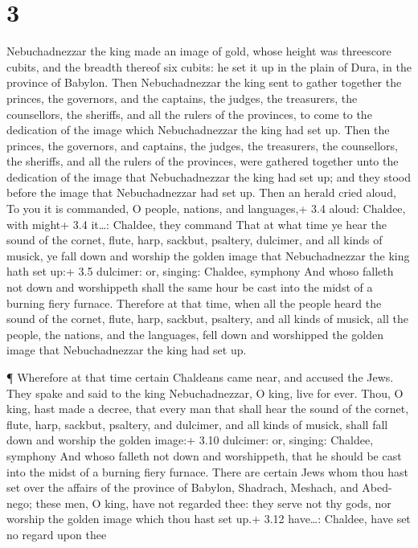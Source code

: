 \hypertarget{section-2}{%
\section{3}\label{section-2}}

 Nebuchadnezzar the king made an image of gold, whose height
was threescore cubits, and the breadth thereof six cubits: he set it up
in the plain of Dura, in the province of Babylon.  Then
Nebuchadnezzar the king sent to gather together the princes, the
governors, and the captains, the judges, the treasurers, the
counsellors, the sheriffs, and all the rulers of the provinces, to come
to the dedication of the image which Nebuchadnezzar the king had set up.
 Then the princes, the governors, and captains, the judges,
the treasurers, the counsellors, the sheriffs, and all the rulers of the
provinces, were gathered together unto the dedication of the image that
Nebuchadnezzar the king had set up; and they stood before the image that
Nebuchadnezzar had set up.  Then an herald cried aloud, To
you it is commanded, O people, nations, and languages,+ 3.4 aloud:
Chaldee, with might+ 3.4 it\ldots: Chaldee, they command 
That at what time ye hear the sound of the cornet, flute, harp, sackbut,
psaltery, dulcimer, and all kinds of musick, ye fall down and worship
the golden image that Nebuchadnezzar the king hath set up:+ 3.5
dulcimer: or, singing: Chaldee, symphony  And whoso falleth
not down and worshippeth shall the same hour be cast into the midst of a
burning fiery furnace.  Therefore at that time, when all the
people heard the sound of the cornet, flute, harp, sackbut, psaltery,
and all kinds of musick, all the people, the nations, and the languages,
fell down and worshipped the golden image that Nebuchadnezzar the king
had set up.

 ¶ Wherefore at that time certain Chaldeans came near, and
accused the Jews.  They spake and said to the king
Nebuchadnezzar, O king, live for ever.  Thou, O king, hast
made a decree, that every man that shall hear the sound of the cornet,
flute, harp, sackbut, psaltery, and dulcimer, and all kinds of musick,
shall fall down and worship the golden image:+ 3.10 dulcimer: or,
singing: Chaldee, symphony  And whoso falleth not down and
worshippeth, that he should be cast into the midst of a burning fiery
furnace.  There are certain Jews whom thou hast set over
the affairs of the province of Babylon, Shadrach, Meshach, and
Abed-nego; these men, O king, have not regarded thee: they serve not thy
gods, nor worship the golden image which thou hast set up.+ 3.12
have\ldots: Chaldee, have set no regard upon thee

